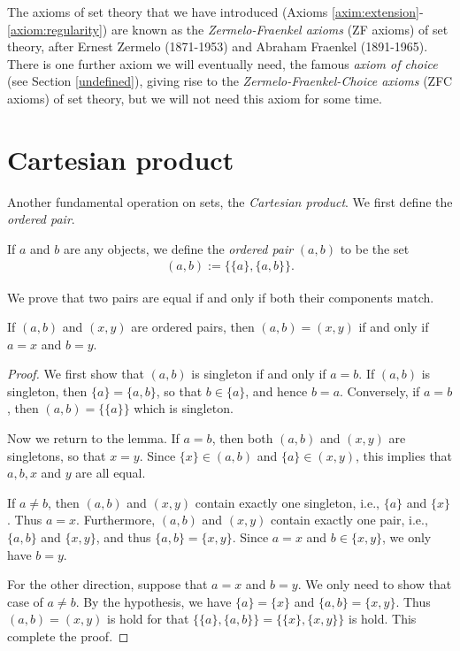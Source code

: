 \begin{remark}
    The axioms of set theory that we have introduced (Axioms \ref{axim:extension}-\ref{axiom:regularity}) are known as the \emph{Zermelo-Fraenkel axioms} (ZF axioms) of set theory, after Ernest Zermelo (1871-1953) and Abraham Fraenkel (1891-1965). There is one further axiom we will eventually need, the famous \emph{axiom of choice} (see Section \ref{undefined}), giving rise to the \emph{Zermelo-Fraenkel-Choice axioms} (ZFC axioms) of set theory, but we will not need this axiom for some time.
\end{remark}

\section{Cartesian product}

Another fundamental operation on sets, the \emph{Cartesian product}. We first define the \emph{ordered pair}.

\begin{definition}
    If $a$ and $b$ are any objects, we define the \emph{ordered pair} $(a, b)$ to be the set
    \begin{align*}
        (a, b) := \{\{a\}, \{a, b\}\}.
    \end{align*}
\end{definition}

We prove that two pairs are equal if and only if both their components match.

\begin{lemma}[Characterisation of or]
    If $(a, b)$ and $(x, y)$ are ordered pairs, then $(a, b) = (x, y)$ if and only if $a = x$ and $b = y$.
\end{lemma}

\begin{proof}
    We first show that $(a, b)$ is singleton if and only if $a = b$. If $(a, b)$ is singleton, then $\{a\} = \{a, b\}$, so that $b \in \{a\}$, and hence $b = a$. Conversely, if $a = b$, then $(a, b) = \{\{a\}\}$ which is singleton.

    Now we return to the lemma. If $a = b$, then both $(a, b)$ and $(x, y)$ are singletons, so that $x = y$. Since $\{x\} \in (a, b)$ and $\{a\} \in (x, y)$, this implies that $a, b, x$ and $y$ are all equal.

    If $a \neq b$, then $(a, b)$ and $(x, y)$ contain exactly one singleton, i.e., $\{a\}$ and $\{x\}$. Thus $a = x$. Furthermore, $(a, b)$ and $(x, y)$ contain exactly one pair, i.e., $\{a, b\}$ and $\{x, y\}$, and thus $\{a, b\} = \{x, y\}$. Since $a = x$ and $b \in \{x, y\}$, we only have $b = y$.

    For the other direction, suppose that $a = x$ and $b = y$. We only need to show that case of $a \neq b$. By the hypothesis, we have $\{a\} = \{x\}$ and $\{a, b\} = \{x, y\}$. Thus $(a, b) = (x, y)$ is hold for that $\{\{a\}, \{a, b\}\} = \{\{x\}, \{x, y\}\}$ is hold. This complete the proof.
\end{proof}

